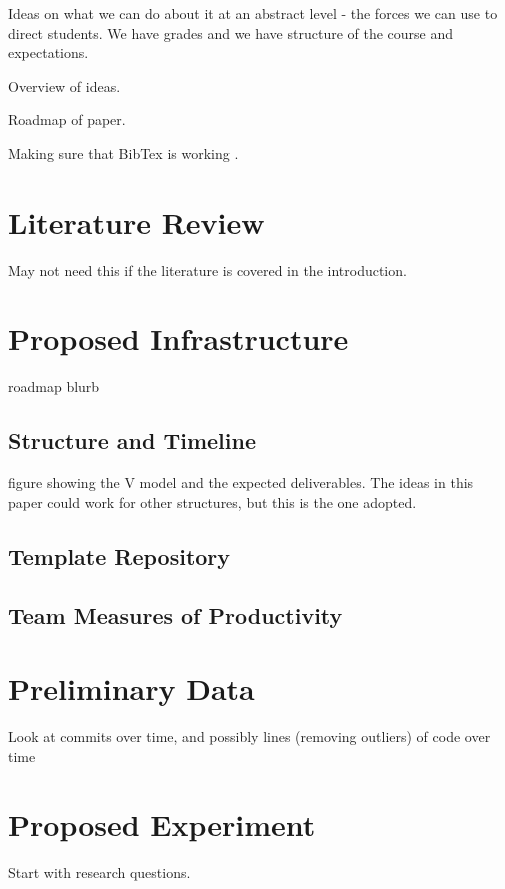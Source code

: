 \documentclass[10pt, conference]{IEEEtran}
\begin{document}
Ideas on what we can do about it at an abstract level - the forces we can use to
direct students.  We have grades and we have structure of the course and
expectations.

Overview of ideas.

Roadmap of paper.

Making sure that BibTex is working \cite{Smith2005}.

\section{Literature Review} \label{SecLitReview}
May not need this if the literature is covered in the introduction.

\section{Proposed Infrastructure} \label{SecInfrastruct}

roadmap blurb

\subsection{Structure and Timeline}

figure showing the V model and the expected deliverables.  The ideas in this
paper could work for other structures, but this is the one adopted.

\subsection{Template Repository}

\subsection{Team Measures of Productivity}

\section{Preliminary Data} \label{SecPrelimData}

Look at commits over time, and possibly lines (removing outliers) of code over
time

\section{Proposed Experiment} \label{SecProposedExperiment}

Start with research questions.
\end{document}
